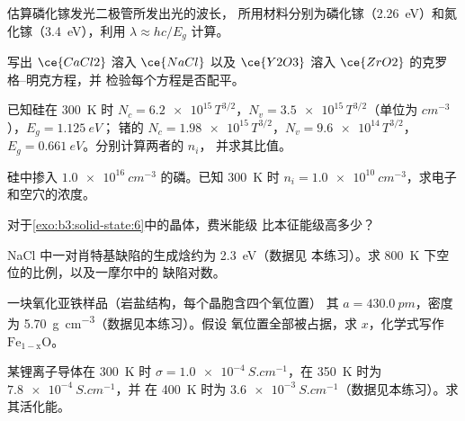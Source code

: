 \begin{exercise}[$\star$]\label{exo:b3:solid-state:3}
估算磷化镓发光二极管所发出光的波长，
所用材料分别为磷化镓（\qty{2.26}{eV}）和氮化镓（\qty{3.4}{eV}），利用 $\lambda \approx hc/E_g$ 计算。
\end{exercise}

\begin{exercise}[$\star$]\label{exo:b3:solid-state:4}
写出 $\ce{CaCl2}$ 溶入 $\ce{NaCl}$ 以及 $\ce{Y2O3}$ 溶入 $\ce{ZrO2}$ 的克罗格–明克方程，并
检验每个方程是否配平。
\end{exercise}

\begin{exercise}[$\star\star$]\label{exo:b3:solid-state:5}
已知硅在 \qty{300}{K} 时 $N_c = \num{6.2e15}\,T^{3/2}$，$N_v = \num{3.5e15}\,T^{3/2}$（单位为 $\unit{cm^{-3}}$），$E_g = \qty{1.125}{eV}$；
锗的 $N_c = \num{1.98e15}\,T^{3/2}$，$N_v = \num{9.6e14}\,T^{3/2}$，$E_g = \qty{0.661}{eV}$。分别计算两者的 $n_i$，
并求其比值。
\end{exercise}

\begin{exercise}[$\star\star$]\label{exo:b3:solid-state:6}
硅中掺入 $\qty{1.0e16}{cm^{-3}}$ 的磷。已知
\qty{300}{K} 时 $n_i = \qty{1.0e10}{cm^{-3}}$，求电子和空穴的浓度。
\end{exercise}

\begin{exercise}[$\star\star$]\label{exo:b3:solid-state:7}
对于\cref{exo:b3:solid-state:6}中的晶体，费米能级
比本征能级高多少？
\end{exercise}

\begin{exercise}[$\star\star$]\label{exo:b3:solid-state:8}
NaCl 中一对肖特基缺陷的生成焓约为 \qty{2.3}{eV}（数据见
本练习）。求 \qty{800}{K} 下空位的比例，以及一摩尔中的
缺陷对数。
\end{exercise}

\begin{exercise}[$\star\star$]\label{exo:b3:solid-state:9}
一块氧化亚铁样品（岩盐结构，每个晶胞含四个氧位置）
其 $a = \qty{430.0}{pm}$，密度为 \qty{5.70}{g.cm^{-3}}（数据见本练习）。假设
氧位置全部被占据，求 $x$，化学式写作 $\mathrm{Fe_{1-x}O}$。
\end{exercise}

\begin{exercise}[$\star\star\star$]\label{exo:b3:solid-state:10}
某锂离子导体在 \qty{300}{K} 时 $\sigma = \qty{1.0e-4}{S.cm^{-1}}$，在 \qty{350}{K} 时为 $\qty{7.8e-4}{S.cm^{-1}}$，并
在 \qty{400}{K} 时为 $\qty{3.6e-3}{S.cm^{-1}}$（数据见本练习）。求其活化能。
\end{exercise}

